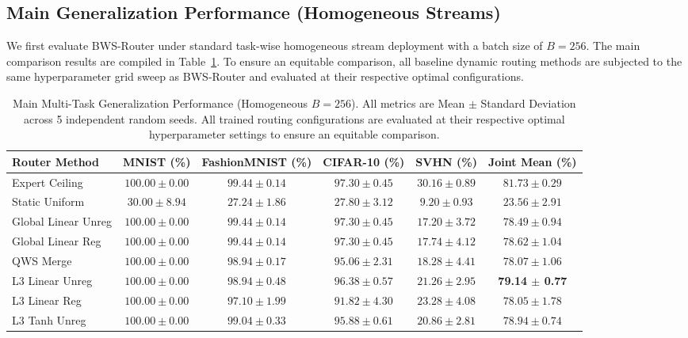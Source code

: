 \subsection{Main Generalization Performance (Homogeneous Streams)}
We first evaluate BWS-Router under standard task-wise homogeneous stream deployment with a batch size of $B=256$. The main comparison results are compiled in Table~\ref{tab:main_results}. To ensure an equitable comparison, all baseline dynamic routing methods are subjected to the same hyperparameter grid sweep as BWS-Router and evaluated at their respective optimal configurations.

\begin{table}[t]
\caption{Main Multi-Task Generalization Performance (Homogeneous $B=256$). All metrics are Mean $\pm$ Standard Deviation across 5 independent random seeds. All trained routing configurations are evaluated at their respective optimal hyperparameter settings to ensure an equitable comparison.}
\label{tab:main_results}
\vskip 0.15in
\begin{center}
\begin{small}
\setlength{\tabcolsep}{4.5pt}
\begin{tabular}{lccccc}
\toprule
\textbf{Router Method} & \textbf{MNIST (\%)} & \textbf{FashionMNIST (\%)} & \textbf{CIFAR-10 (\%)} & \textbf{SVHN (\%)} & \textbf{Joint Mean (\%)} \\
\midrule
Expert Ceiling & $100.00 \pm 0.00$ & $99.44 \pm 0.14$ & $97.30 \pm 0.45$ & $30.16 \pm 0.89$ & $81.73 \pm 0.29$ \\ 
Static Uniform & $30.00 \pm 8.94$ & $27.24 \pm 1.86$ & $27.80 \pm 3.12$ & $9.20 \pm 0.93$ & $23.56 \pm 2.91$ \\ 
\midrule
Global Linear Unreg & $100.00 \pm 0.00$ & $99.44 \pm 0.14$ & $97.30 \pm 0.45$ & $17.20 \pm 3.72$ & $78.49 \pm 0.94$ \\ 
Global Linear Reg & $100.00 \pm 0.00$ & $99.44 \pm 0.14$ & $97.30 \pm 0.45$ & $17.74 \pm 4.12$ & $78.62 \pm 1.04$ \\ 
\midrule
QWS Merge & $100.00 \pm 0.00$ & $98.94 \pm 0.17$ & $95.06 \pm 2.31$ & $18.28 \pm 4.41$ & $78.07 \pm 1.06$ \\ 
\midrule
L3 Linear Unreg & $100.00 \pm 0.00$ & $98.94 \pm 0.48$ & $96.38 \pm 0.57$ & $21.26 \pm 2.95$ & \textbf{79.14 $\pm$ 0.77} \\ 
L3 Linear Reg & $100.00 \pm 0.00$ & $97.10 \pm 1.99$ & $91.82 \pm 4.30$ & $23.28 \pm 4.08$ & $78.05 \pm 1.78$ \\ 
L3 Tanh Unreg & $100.00 \pm 0.00$ & $99.04 \pm 0.33$ & $95.88 \pm 0.61$ & $20.86 \pm 2.81$ & $78.94 \pm 0.74$ \\ 

\end{tabular}
\end{small}
\end{center}
\end{table}
